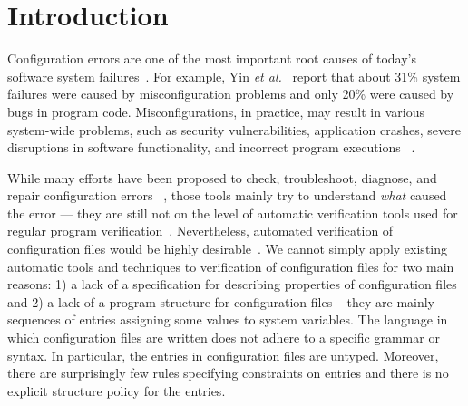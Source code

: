 \section{Introduction}
\label{sec-intro}

Configuration errors are one of the most important root causes of
today's software system failures~\cite{xu15systems, yin11anempirical}.
For example, Yin {\em et al.}~\cite{yin11anempirical} report
that about 31\% system failures were caused by misconfiguration problems and only 20\% were caused by bugs in program code. 
Misconfigurations, in practice, may result in various
system-wide problems, such as security vulnerabilities, 
application crashes, severe disruptions in software
functionality, and incorrect program executions%
~\cite{zhang14encore, yuan11context, xu13do, xu15hey}.  

While many efforts have been proposed 
to check, troubleshoot, diagnose, and repair configuration errors%
~\cite{attariyan10automating,
su07autobash, whitaker04configuration},
those tools mainly try to understand {\emph{what}} caused the error ---
they are still not on the level of
automatic verification tools used for regular program 
verification~\cite{Leino10Dafny, PiskacWZ14, BobotFMP15}.
Nevertheless, automated verification of configuration 
files would be highly
desirable~\cite{wang04automatic, zhang14encore, xu15systems}.
We cannot simply apply existing automatic 
tools and techniques to verification of configuration files for two main reasons: 1) a lack
of a specification for describing properties of configuration files and 2) a lack of a program structure for configuration files -- they
are mainly sequences of entries assigning some values to system variables. The language in which configuration files are written does 
not adhere to a specific grammar or syntax. In particular,  the
entries in configuration files are untyped. Moreover, there are surprisingly few rules specifying constraints on entries and there
is no explicit structure policy for the entries.

